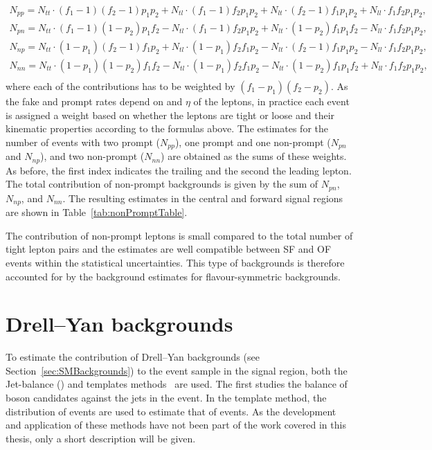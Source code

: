 \begin{eqnarray*}
N_{pp} = N_{tt}\cdot(f_1 -1)(f_2-1)p_1p_2 + N_{tl}\cdot(f_1 -1)f_2p_1p_2 + N_{lt}\cdot (f_2-1)f_1p_1p_2 + N_{ll}\cdot f_1f_2p_1p_2,\\
N_{pn} = N_{tt}\cdot(f_1 -1)(1-p_2)p_1f_2 - N_{tl}\cdot(f_1 -1)f_2p_1p_2 + N_{lt}\cdot (1-p_2)f_1p_1f_2 - N_{ll}\cdot f_1f_2p_1p_2,\\
N_{np} = N_{tt}\cdot(1 - p_1)(f_2 - 1)f_1p_2 + N_{tl}\cdot(1-p_1)f_2f_1p_2 - N_{lt}\cdot (f_2-1)f_1p_1p_2 - N_{ll}\cdot f_1f_2p_1p_2,\\
N_{nn} = N_{tt}\cdot(1-p_1)(1-p_2)f_1f_2 - N_{tl}\cdot (1-p_1)f_2f_1p_2 - N_{lt}\cdot (1-p_2)f_1p_1f_2 + N_{ll}\cdot f_1f_2p_1p_2,\\
\end{eqnarray*}
where each of the contributions has to be weighted by $(f_1-p_1)(f_2-p_2)$. As the fake and prompt rates depend on \pt and $\eta$ of the leptons, in practice each event is assigned a weight based on whether the leptons are tight or loose and their kinematic properties according to the formulas above. The estimates for the number of events with two prompt ($N_{pp}$), one prompt and one non-prompt ($N_{pn}$ and $N_{np}$), and two non-prompt ($N_{nn}$) are obtained as the sums of these weights. As before, the first index indicates the trailing and the second the leading lepton. The total contribution of non-prompt backgrounds is given by the sum of $N_{pn}$, $N_{np}$, and $N_{nn}$. The resulting estimates in the central and forward signal regions are shown in Table~\ref{tab:nonPromptTable}. 

The contribution of non-prompt leptons is small compared to the total number of tight lepton pairs and the estimates are well compatible between SF and OF events within the statistical uncertainties. This type of backgrounds is therefore accounted for by the background estimates for flavour-symmetric backgrounds.

\section{Drell--Yan backgrounds}
To estimate the contribution of Drell--Yan backgrounds (see Section~\ref{sec:SMBackgrounds}) to the event sample in the signal region, both the Jet-\Z balance (\JZB) and \MET templates methods~\cite{Chatrchyan:2012qka} are used. The first studies the balance of \Z boson candidates against the jets in the event. In the \MET template method, the \MET distribution of \gjets events are used to estimate that of \zjets events. As the development and application of these methods have not been part of the work covered in this thesis, only a short description will be given.

